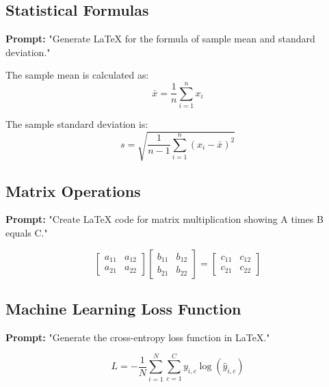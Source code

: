\documentclass[12pt, a4paper]{article}
\begin{document}
\subsection{Statistical Formulas}

\textbf{Prompt:} "Generate LaTeX for the formula of sample mean and standard deviation."

The sample mean is calculated as:
\begin{equation}
    \bar{x} = \frac{1}{n}\sum_{i=1}^{n} x_i
    \label{eq:mean}
\end{equation}

The sample standard deviation is:
\begin{equation}
    s = \sqrt{\frac{1}{n-1}\sum_{i=1}^{n}(x_i - \bar{x})^2}
    \label{eq:stddev}
\end{equation}

\subsection{Matrix Operations}

\textbf{Prompt:} "Create LaTeX code for matrix multiplication showing A times B equals C."

\begin{equation}
    \begin{bmatrix}
        a_{11} & a_{12} \\
        a_{21} & a_{22}
    \end{bmatrix}
    \begin{bmatrix}
        b_{11} & b_{12} \\
        b_{21} & b_{22}
    \end{bmatrix}
    =
    \begin{bmatrix}
        c_{11} & c_{12} \\
        c_{21} & c_{22}
    \end{bmatrix}
    \label{eq:matrix}
\end{equation}

\subsection{Machine Learning Loss Function}

\textbf{Prompt:} "Generate the cross-entropy loss function in LaTeX."

\begin{equation}
    L = -\frac{1}{N}\sum_{i=1}^{N}\sum_{c=1}^{C}y_{i,c}\log(\hat{y}_{i,c})
    \label{eq:crossentropy}
\end{equation}
\end{document}
